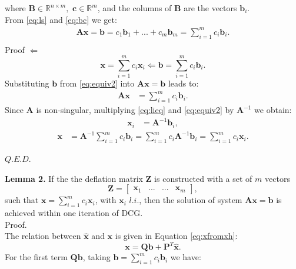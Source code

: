 \documentclass[12pt]{article}
\begin{document}
where $\mathbf{B} \in \mathbb{R}^{n\times m},$ $\mathbf{c} \in \mathbb{R}^{m}$, and the columns of $\mathbf{B}$
are the vectors $\mathbf{b}_i$.\\
From \eqref{eq:ls} and \eqref{eq:bc} we get:
\begin{align*}
\mathbf{A}\mathbf{x}=\mathbf{b}=c_1\mathbf{b}_1+...+c_m\mathbf{b}_m=\sum_{i=1}^m {c}_i\mathbf{b}_i.\\
\end{align*}
Proof $\Leftarrow $
\begin{equation}\label{eq:equiv2}
\mathbf{x}=\sum_{i=1}^m {c}_i\mathbf{x}_i\Leftarrow \mathbf{b}=\sum_{i=1}^m {c}_i\mathbf{b}_i .
\end{equation}
Substituting $\mathbf{b}$ from \eqref{eq:equiv2} into $\mathbf{A}\mathbf{x}=\mathbf{b}$ leads to:
\begin{align}\label{eq:equiv21}
\mathbf{A}\mathbf{x}&=\sum_{i=1}^m {c}_i\mathbf{b}_i.
\end{align}
Since $\mathbf{A}$ is non-singular, multiplying \eqref{eq:lieq} and \eqref{eq:equiv2} by $\mathbf{A}^{-1}$ we obtain:
\begin{align}\label{eq:equiv21}
\mathbf{x}_i&=\mathbf{A}^{-1}\mathbf{b}_i,
\end{align}
\begin{align}\label{eq:equiv21}
\mathbf{x}&=\mathbf{A}^{-1}\sum_{i=1}^m {c}_i\mathbf{b}_i=\sum_{i=1}^m {c}_i\mathbf{A}^{-1}\mathbf{b}_i=\sum_{i=1}^m {c}_i\mathbf{x}_i.
\end{align}
\begin{flushright}
$Q.E.D.$                  
\end{flushright}
\textbf{Lemma 2.}
If the the deflation matrix $\mathbf{Z}$ is constructed with a set of $m$ vectors 
\begin{equation}
 \mathbf{Z}=
\begin{bmatrix}
\mathbf{x}_1&...&...&\mathbf{x}_m
\end{bmatrix}, 
\end{equation}
such that $\mathbf{x}=\sum_{i=1}^m {c}_i\mathbf{x}_i$, with $\mathbf{x}_i$ $l.i.$, then the solution of
system $\mathbf{A}\mathbf{x}=\mathbf{b}$ is achieved within one iteration of DCG.\\
Proof.\\
The relation between $\mathbf{\hat{x}}$ and $\mathbf{x}$ is given in Equation \eqref{eq:xfromxh}:
\begin{equation*}
    \mathbf{x}=\mathbf{Q}\mathbf{b}+\mathbf{P}^T\mathbf{\hat{x}}. 
\end{equation*}
For the first term $\mathbf{Q}\mathbf{b}$, taking $\mathbf{b}=\sum_{i=1}^m {c}_i\mathbf{b}_i$ we have:
\end{document}

